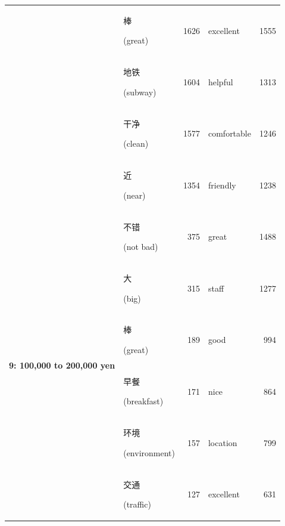 \documentclass[smallextended,natbib]{svjour3}       %
\begin{document}
\begin{table}[ht]
{\begin{tabular}{|c|lr|lr|}
                                                             & \begin{CJK}{UTF8}{gbsn}棒\end{CJK} (great)            & 1626  & excellent   & 1555  \\  
                                                             & \begin{CJK}{UTF8}{gbsn}地铁\end{CJK} (subway)          & 1604  & helpful     & 1313  \\  
                                                             & \begin{CJK}{UTF8}{gbsn}干净\end{CJK} (clean)           & 1577  & comfortable & 1246  \\  
                                                             & \begin{CJK}{UTF8}{gbsn}近\end{CJK} (near)             & 1354  & friendly    & 1238  \\ \hline
        \multirow{10}{*}{\textbf{9: 100,000 to 200,000 yen}} & \begin{CJK}{UTF8}{gbsn}不错\end{CJK} (not bad)         & 375   & great       & 1488  \\  
                                                             & \begin{CJK}{UTF8}{gbsn}大\end{CJK} (big)              & 315   & staff       & 1277  \\  
                                                             & \begin{CJK}{UTF8}{gbsn}棒\end{CJK} (great)            & 189   & good        & 994   \\  
                                                             & \begin{CJK}{UTF8}{gbsn}早餐\end{CJK} (breakfast)       & 171   & nice        & 864   \\  
                                                             & \begin{CJK}{UTF8}{gbsn}环境\end{CJK} (environment)    & 157   & location    & 799   \\  
                                                             & \begin{CJK}{UTF8}{gbsn}交通\end{CJK} (traffic)         & 127   & excellent   & 631   \\  

\end{tabular}}
\end{table}
\end{document}
